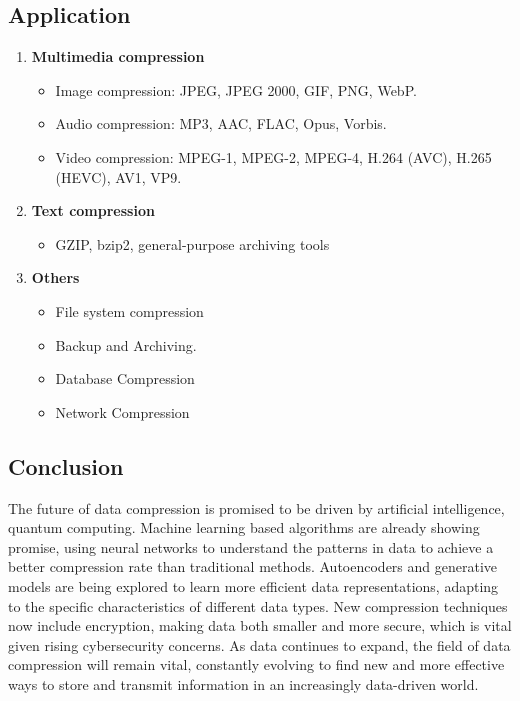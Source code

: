 \subsection{Application}
\begin{enumerate}[label=\textbf{\Alph*.}]
    \item \textbf{Multimedia compression} \begin{itemize}
        \item Image compression: JPEG, JPEG 2000, GIF, PNG, WebP.
        \item Audio compression: MP3, AAC, FLAC, Opus, Vorbis.
        \item Video compression: MPEG-1, MPEG-2, MPEG-4, H.264 (AVC), H.265 (HEVC), AV1, VP9.
    \end{itemize}
    \item \textbf{Text compression} \begin{itemize}
        \item GZIP, bzip2, general-purpose archiving tools
    \end{itemize}
    \item \textbf{Others} \begin{itemize}
        \item File system compression
        \item Backup and Archiving.
        \item Database Compression
        \item Network Compression
    \end{itemize}
\end{enumerate}

\subsection{Conclusion} %
The future of data compression is promised to be driven by artificial intelligence, quantum computing. Machine learning based algorithms are already showing promise, using neural networks to understand the patterns in data to achieve a better compression rate than traditional methods. Autoencoders and generative models are being explored to learn more efficient data representations, adapting to the specific characteristics of different data types. New compression techniques now include encryption, making data both smaller and more secure, which is vital given rising cybersecurity concerns. As data continues to expand, the field of data compression will remain vital, constantly evolving to find new and more effective ways to store and transmit information in an increasingly data-driven world.